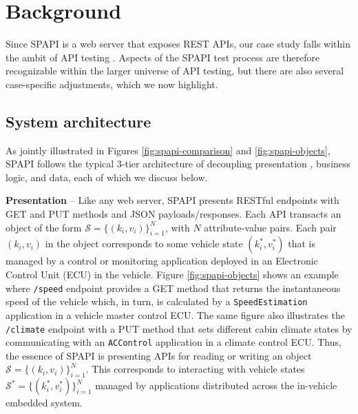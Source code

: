 \section{Background}
Since SPAPI is a web server that exposes REST APIs, our case study falls within the ambit of API testing \cite{10.1145/3617175}. Aspects of the SPAPI test process are therefore recognizable within the larger universe of API testing, but there are also several case-specific adjustments, which we now highlight. 

\subsection{System architecture}


As jointly illustrated in Figures \ref{fig:spapi-comparison} and \ref{fig:spapi-objects}, SPAPI follows the typical 3-tier architecture of decoupling presentation \cite{liu2005modeling}, business logic, and data, each of which we discuss below. 

\noindent \textbf{Presentation} -- Like any web server, SPAPI presents RESTful endpoints with GET and PUT methods and JSON payloads/responses. Each API transacts an object of the form $\mathcal{S} = \{(k_i, v_i)\}_{i=1}^N$, with $N$ attribute-value pairs. Each pair $(k_i, v_i)$ in the object corresponds to some vehicle state $(k^*_i, v^*_i)$ that is managed by a control or monitoring application deployed in an Electronic Control Unit (ECU) in the vehicle. Figure \ref{fig:spapi-objects} shows an example where \texttt{/speed} endpoint provides a GET method that returns the instantaneous speed of the vehicle which, in turn, is calculated by a \texttt{SpeedEstimation} application in a vehicle master control ECU. The same figure also illustrates the \texttt{/climate} endpoint with a PUT method that sets different cabin climate states by communicating with an \texttt{ACControl} application in a climate control ECU. Thus, the essence of SPAPI is presenting APIs for reading or writing an object $\mathcal{S} = \{(k_i, v_i)\}_{i=1}^N$. This corresponds to interacting with vehicle states $\mathcal{S}^* = \{(k^*_i, v^*_i)\}_{i=1}^N$ managed by applications distributed across the in-vehicle embedded system.

